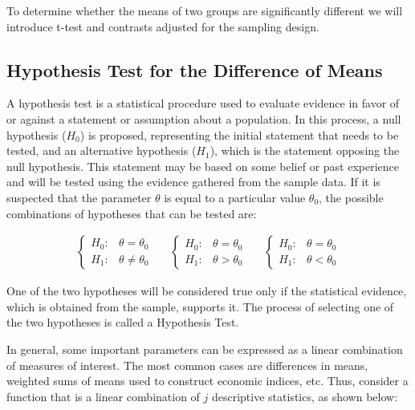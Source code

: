 \documentclass[
  12pt,
]{book}
\begin{document}
To determine whether the means of two groups are significantly different we will introduce t-test and contrasts adjusted for the sampling design.

\hypertarget{hypothesis-test-for-the-difference-of-means}{%
\subsection{Hypothesis Test for the Difference of Means}\label{hypothesis-test-for-the-difference-of-means}}

A hypothesis test is a statistical procedure used to evaluate evidence in favor of or against a statement or assumption about a population. In this process, a null hypothesis (\(H_0\)) is proposed, representing the initial statement that needs to be tested, and an alternative hypothesis (\(H_1\)), which is the statement opposing the null hypothesis. This statement may be based on some belief or past experience and will be tested using the evidence gathered from the sample data. If it is suspected that the parameter \(\theta\) is equal to a particular value \(\theta_{0}\), the possible combinations of hypotheses that can be tested are:

\begin{eqnarray*}
\begin{cases}
H_{0}: & \theta=\theta_{0}\\
H_{1}: & \theta\neq\theta_{0}
\end{cases}\,\,\,\,\,\,\,\,\,   
\begin{cases}
H_{0}: & \theta=\theta_{0}\\
H_{1}: & \theta>\theta_{0}
\end{cases}\,\,\,\,\,\,\,\,\,   
\begin{cases}
H_{0}: & \theta=\theta_{0}\\
H_{1}: & \theta<\theta_{0}
\end{cases}
\end{eqnarray*}

One of the two hypotheses will be considered true only if the statistical evidence, which is obtained from the sample, supports it. The process of selecting one of the two hypotheses is called a Hypothesis Test.

In general, some important parameters can be expressed as a linear combination of measures of interest. The most common cases are differences in means, weighted sums of means used to construct economic indices, etc. Thus, consider a function that is a linear combination of \(j\) descriptive statistics, as shown below:
\end{document}
